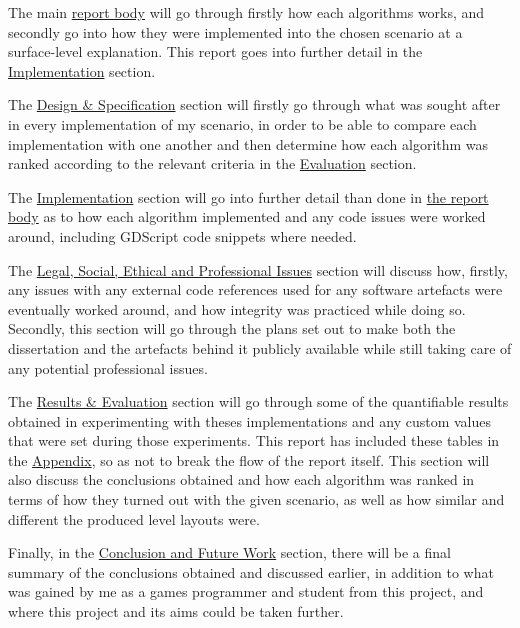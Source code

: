 \documentclass[11pt]{informatics-report}
\begin{document}
The main \hyperref[Body]{report body} will go through firstly how each algorithms works, and secondly go into how they were implemented into the chosen scenario at a surface-level explanation. This report goes into further detail in the \hyperref[Implementation]{Implementation} section.

The \hyperref[Design]{Design \& Specification} section will firstly go through what was sought after in every implementation of my scenario, in order to be able to compare each implementation with one another and then determine how each algorithm was ranked according to the relevant criteria in the \hyperref[Evaluation]{Evaluation} section.

The \hyperref[Implementation]{Implementation} section will go into further detail than done in \hyperref[Body]{the report body} as to how each algorithm implemented and any code issues were worked around, including GDScript code snippets where needed.

The \hyperref[Issues]{Legal, Social, Ethical and Professional Issues} section will discuss how, firstly, any issues with any external code references used for any software artefacts were eventually worked around, and how integrity was practiced while doing so. Secondly, this section will go through the plans set out to make both the dissertation and the artefacts behind it publicly available while still taking care of any potential professional issues. 

The \hyperref[Evaluation]{Results \& Evaluation} section will go through some of the quantifiable results obtained in experimenting with theses implementations and any custom values that were set during those experiments. This report has included these tables in the \hyperref[Appendix]{Appendix}, so as not to break the flow of the report itself. This section will also discuss the conclusions obtained and how each algorithm was ranked in terms of how they turned out with the given scenario, as well as how similar and different the produced level layouts were.

Finally, in the \hyperref[Conclusion]{Conclusion and Future Work} section, there will be a final summary of the conclusions obtained and discussed earlier, in addition to what was gained by me as a games programmer and student from this project, and where this project and its aims could be taken further.











\nocite{*}

\appendix



\end{document}
